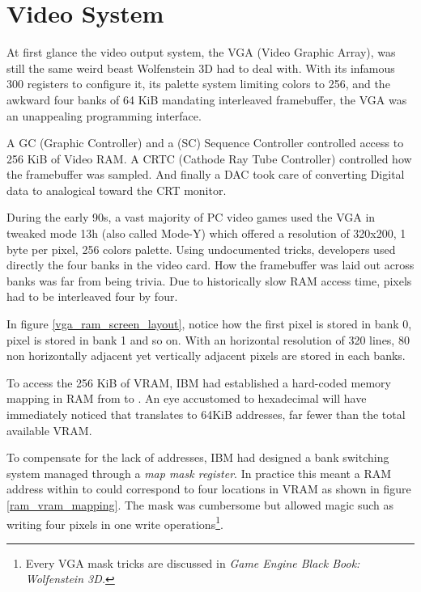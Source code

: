 \section{Video System}
At first glance the video output system, the VGA (Video Graphic Array), was still the same weird beast Wolfenstein 3D had to deal with. With its infamous 300 registers to configure it, its palette system limiting colors to 256, and the awkward four banks of 64 KiB mandating interleaved framebuffer, the VGA was an unappealing programming interface.\\
\par
A GC (Graphic Controller) and a (SC) Sequence Controller controlled access to 256 KiB of Video RAM. A CRTC (Cathode Ray Tube Controller) controlled how the framebuffer was sampled. And finally a DAC took care of converting Digital data to analogical toward the CRT monitor.\\
\par 	
{}
\par
During the early 90s, a vast majority of PC video games used the VGA in tweaked mode 13h (also called Mode-Y) which offered a resolution of 320x200, 1 byte per pixel, 256 colors palette. Using undocumented tricks, developers used directly the four banks in the video card. How the framebuffer was laid out across banks was far from being trivia. Due to historically slow RAM access time, pixels had to be interleaved four by four.




\par
In figure \ref{vga_ram_screen_layout}, notice how the first pixel  is stored in bank 0, pixel  is stored in bank 1 and so on. With an horizontal resolution of 320 lines, 80 non horizontally adjacent yet vertically adjacent pixels are stored in each banks.\\
\par
To access the 256 KiB of VRAM, IBM had established a hard-coded memory mapping in RAM from  to . An eye accustomed to hexadecimal will have immediately noticed that  translates to 64KiB addresses, far fewer than the total available VRAM.\\
\par
 To compensate for the lack of addresses, IBM had designed a bank switching system managed through a \textit{map mask register}. In practice this meant a RAM address within  to  could correspond to four locations in VRAM as shown in figure \ref{ram_vram_mapping}. The mask was cumbersome but allowed magic such as writing four pixels in one write operations\footnote{Every VGA mask tricks are discussed in \it{Game Engine Black Book: Wolfenstein 3D}.}.



